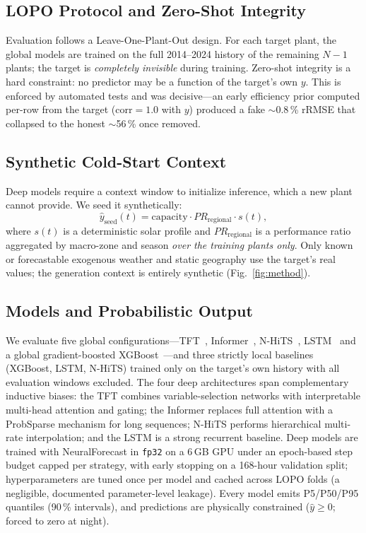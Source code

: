 \documentclass[conference]{IEEEtran}
\begin{document}
\subsection{LOPO Protocol and Zero-Shot Integrity}
Evaluation follows a Leave-One-Plant-Out design. For each target plant, the global models
are trained on the full 2014--2024 history of the remaining $N{-}1$ plants; the target is
\emph{completely invisible} during training. Zero-shot integrity is a hard constraint: no
predictor may be a function of the target's own $y$. This is enforced by automated tests and
was decisive---an early efficiency prior computed per-row from the target
($\mathrm{corr}=1.0$ with $y$) produced a fake $\sim$0.8\,\% rRMSE that collapsed to the
honest $\sim$56\,\% once removed.

\subsection{Synthetic Cold-Start Context}
Deep models require a context window to initialize inference, which a new plant cannot
provide. We seed it synthetically:
\begin{equation}
\hat{y}_{\text{seed}}(t) = \mathrm{capacity}\cdot PR_{\text{regional}}\cdot s(t),
\end{equation}
where $s(t)$ is a deterministic solar profile and $PR_{\text{regional}}$ is a performance
ratio aggregated by macro-zone and season \emph{over the training plants only}. Only known or
forecastable exogenous weather and static geography use the target's real values; the
generation context is entirely synthetic (Fig.~\ref{fig:method}).

\subsection{Models and Probabilistic Output}
We evaluate five global configurations---TFT~\cite{Lim2021}, Informer~\cite{Zhou2021},
N-HiTS~\cite{Challu2023}, LSTM~\cite{Hochreiter1997} and a global gradient-boosted
XGBoost~\cite{Chen2016}---and three strictly local baselines (XGBoost, LSTM, N-HiTS) trained
only on the target's own history with all evaluation windows excluded. The four deep
architectures span complementary inductive biases: the TFT combines variable-selection
networks with interpretable multi-head attention and gating; the Informer replaces full
attention with a ProbSparse mechanism for long sequences; N-HiTS performs hierarchical
multi-rate interpolation; and the LSTM is a strong recurrent baseline. Deep models are
trained with NeuralForecast in \texttt{fp32} on a 6\,GB GPU under an epoch-based step budget
capped per strategy, with early stopping on a 168-hour validation split; hyperparameters are
tuned once per model and cached across LOPO folds (a negligible, documented parameter-level
leakage). Every model emits P5/P50/P95 quantiles (90\,\% intervals), and predictions are
physically constrained ($\hat{y}\!\geq\!0$; forced to zero at night).
\end{document}
